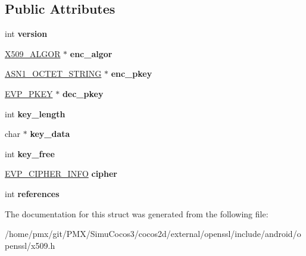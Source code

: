 \subsection*{Public Attributes}
\begin{DoxyCompactItemize}
\item 
\mbox{\label{structprivate__key__st_a16bd44f055e649572a0f5b0d62a92219}} 
int {\bfseries version}
\item 
\mbox{\label{structprivate__key__st_a239844123c47a21a3e349f1740a899af}} 
\hyperlink{structX509__algor__st}{X509\+\_\+\+A\+L\+G\+OR} $\ast$ {\bfseries enc\+\_\+algor}
\item 
\mbox{\label{structprivate__key__st_a56f1fec1e6c85d0cb893ec614af7ced7}} 
\hyperlink{structasn1__string__st}{A\+S\+N1\+\_\+\+O\+C\+T\+E\+T\+\_\+\+S\+T\+R\+I\+NG} $\ast$ {\bfseries enc\+\_\+pkey}
\item 
\mbox{\label{structprivate__key__st_a554f93cdf5795cc4ab641295d00f6693}} 
\hyperlink{structevp__pkey__st}{E\+V\+P\+\_\+\+P\+K\+EY} $\ast$ {\bfseries dec\+\_\+pkey}
\item 
\mbox{\label{structprivate__key__st_a4fd59ffeb31b0bc4acf1330ba4c1cfab}} 
int {\bfseries key\+\_\+length}
\item 
\mbox{\label{structprivate__key__st_a820a1741b4ae3bfbc81f0ff123339cef}} 
char $\ast$ {\bfseries key\+\_\+data}
\item 
\mbox{\label{structprivate__key__st_a6cba7d7973cf8425493d996dd8464e29}} 
int {\bfseries key\+\_\+free}
\item 
\mbox{\label{structprivate__key__st_afeef179b98e87f1f950eb977dda61fc4}} 
\hyperlink{structevp__cipher__info__st}{E\+V\+P\+\_\+\+C\+I\+P\+H\+E\+R\+\_\+\+I\+N\+FO} {\bfseries cipher}
\item 
\mbox{\label{structprivate__key__st_a96a0fec0281fed6acf1d455f2d5c93ff}} 
int {\bfseries references}
\end{DoxyCompactItemize}


The documentation for this struct was generated from the following file\+:\begin{DoxyCompactItemize}
\item 
/home/pmx/git/\+P\+M\+X/\+Simu\+Cocos3/cocos2d/external/openssl/include/android/openssl/x509.\+h\end{DoxyCompactItemize}
